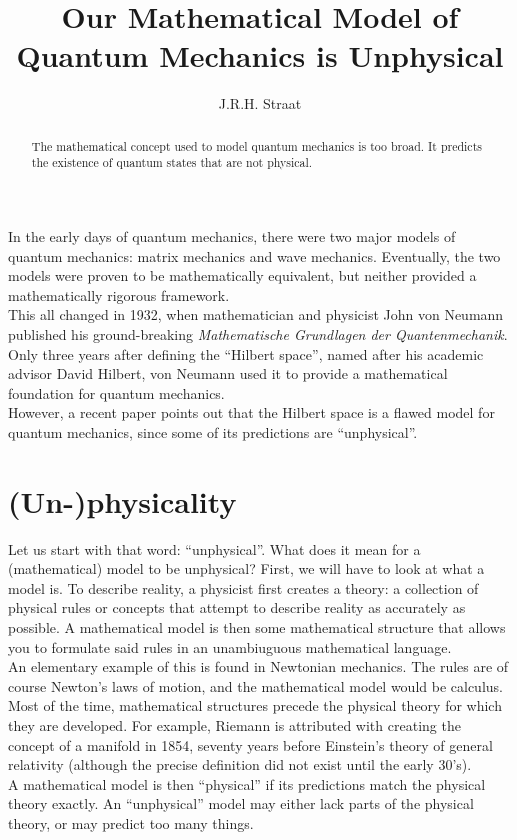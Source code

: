 \documentclass[12pt]{article}
\title{Our Mathematical Model of Quantum Mechanics is Unphysical}      %
\author{J.R.H. Straat}
\date{}
\begin{document}
\maketitle
%
\begin{abstract}
	The mathematical concept used to model quantum mechanics is too broad. It predicts the existence of quantum states that are not physical.
\end{abstract}
%
\begin{multicols}{2}
    In the early days of quantum mechanics, there were two major models of quantum mechanics: matrix mechanics and wave mechanics. Eventually, the two models were proven to be mathematically equivalent, but neither provided a mathematically rigorous framework.\\
    This all changed in 1932, when mathematician and physicist John von Neumann published his ground-breaking \textit{Mathematische Grundlagen der Quantenmechanik}\cite{von_neumann_mathematische_1996}. Only three years after defining the ``Hilbert space'', named after his academic advisor David Hilbert, von Neumann used it to provide a mathematical foundation for quantum mechanics.\\
    However, a recent paper\cite{carcassi_unphysicality_2023} points out that the Hilbert space is a flawed model for quantum mechanics, since some of its predictions are ``unphysical''.
    \section{(Un-)physicality}
    Let us start with that word: ``unphysical''. What does it mean for a (mathematical) model to be unphysical? First, we will have to look at what a model is. To describe reality, a physicist first creates a theory: a collection of physical rules or concepts that attempt to describe reality as accurately as possible. A mathematical model is then some mathematical structure that allows you to formulate said rules in an unambiuguous mathematical language.\\
    An elementary example of this is found in Newtonian mechanics. The rules are of course Newton's laws of motion, and the mathematical model would be calculus.\\
    Most of the time, mathematical structures precede the physical theory for which they are developed. For example, Riemann is attributed with creating the concept of a manifold in 1854, seventy years before Einstein's theory of general relativity (although the precise definition did not exist until the early 30's).\\
    A mathematical model is then ``physical'' if its predictions match the physical theory exactly. An ``unphysical'' model may either lack parts of the physical theory, or may predict too many things.

\end{multicols}
\end{document}
